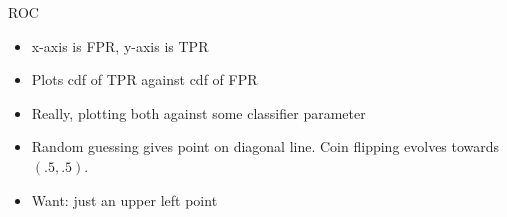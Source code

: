ROC
\begin{itemize}
\item x-axis is FPR, y-axis is TPR
\item Plots cdf of TPR against cdf of FPR
\item Really, plotting both against some classifier parameter
\item Random guessing gives point on diagonal line.  Coin flipping evolves towards $(.5, .5)$.
\item Want: just an upper left point
\end{itemize}



